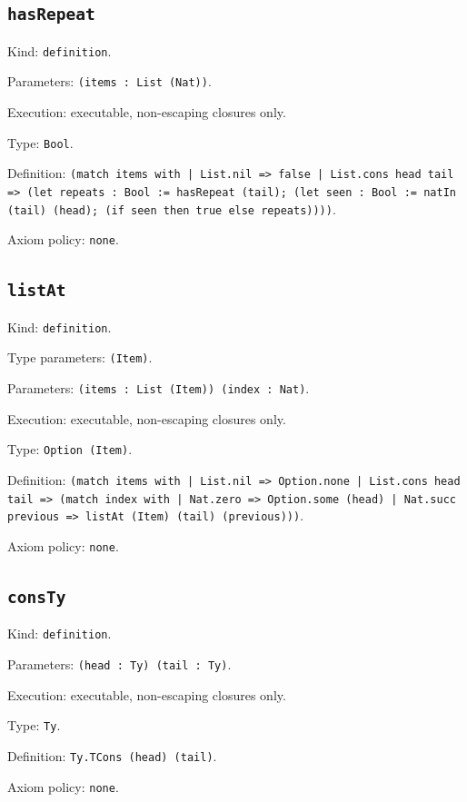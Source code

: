 \documentclass[11pt]{article}
\begin{document}
\subsection*{\texttt{hasRepeat}}
\noindent Kind: \texttt{definition}.\par
\noindent Parameters: \texttt{(items : List (Nat))}.\par
\noindent Execution: executable, non-escaping closures only.\par
\noindent Type: \texttt{Bool}.\par
\noindent Definition: \texttt{(match items with | List.nil => false | List.cons head tail => (let repeats : Bool := hasRepeat (tail); (let seen : Bool := natIn (tail) (head); (if seen then true else repeats))))}.\par
\noindent Axiom policy: \texttt{none}.\par
\subsection*{\texttt{listAt}}
\noindent Kind: \texttt{definition}.\par
\noindent Type parameters: \texttt{(Item)}.\par
\noindent Parameters: \texttt{(items : List (Item)) (index : Nat)}.\par
\noindent Execution: executable, non-escaping closures only.\par
\noindent Type: \texttt{Option (Item)}.\par
\noindent Definition: \texttt{(match items with | List.nil => Option.none | List.cons head tail => (match index with | Nat.zero => Option.some (head) | Nat.succ previous => listAt (Item) (tail) (previous)))}.\par
\noindent Axiom policy: \texttt{none}.\par
\subsection*{\texttt{consTy}}
\noindent Kind: \texttt{definition}.\par
\noindent Parameters: \texttt{(head : Ty) (tail : Ty)}.\par
\noindent Execution: executable, non-escaping closures only.\par
\noindent Type: \texttt{Ty}.\par
\noindent Definition: \texttt{Ty.TCons (head) (tail)}.\par
\noindent Axiom policy: \texttt{none}.\par
\end{document}
